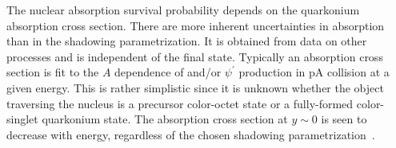 

The nuclear absorption survival probability depends on the quarkonium 
absorption cross section. There are more inherent uncertainties 
in absorption than in the shadowing parametrization. It is obtained 
from data on other processes and is independent of the final 
state. Typically an absorption cross section is fit to the $A$ dependence 
of \jpsi and/or $\psi^{'}$ production in pA collision at a given energy. 
This is rather simplistic since it is unknown whether the object traversing the nucleus is a precursor 
color-octet state or a fully-formed color-singlet quarkonium state. The \jpsi absorption cross 
section at $y \sim 0$ is seen to decrease with energy, regardless of the chosen shadowing 
parametrization~\cite{Lourenco:2008sk}. 




